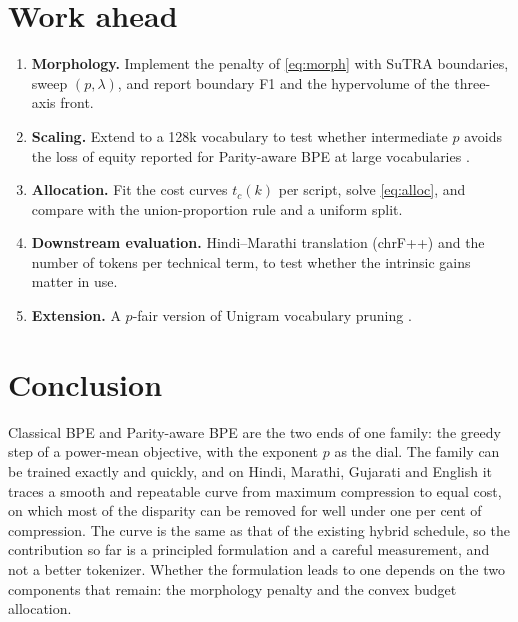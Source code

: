 \documentclass[11pt,a4paper]{article}
\theoremstyle{remark}
\begin{document}
\section{Work ahead}

\begin{enumerate}
  \item \textbf{Morphology.} Implement the penalty of \eqref{eq:morph} with SuTRA
  boundaries, sweep $(p,\lambda)$, and report boundary F1 and the hypervolume of the
  three-axis front.
  \item \textbf{Scaling.} Extend to a 128k vocabulary to test whether intermediate $p$
  avoids the loss of equity reported for Parity-aware BPE at large vocabularies
  \cite{lee2026}.
  \item \textbf{Allocation.} Fit the cost curves $t_c(k)$ per script, solve
  \eqref{eq:alloc}, and compare with the union-proportion rule \cite{brahma2026} and a
  uniform split.
  \item \textbf{Downstream evaluation.} Hindi--Marathi translation (chrF++) and the number
  of tokens per technical term, to test whether the intrinsic gains matter in use.
  \item \textbf{Extension.} A $p$-fair version of Unigram vocabulary pruning
  \cite{kudo2018}.
\end{enumerate}

\section{Conclusion}

Classical BPE and Parity-aware BPE are the two ends of one family: the greedy step of a
power-mean objective, with the exponent $p$ as the dial. The family can be trained exactly
and quickly, and on Hindi, Marathi, Gujarati and English it traces a smooth and repeatable
curve from maximum compression to equal cost, on which most of the disparity can be removed
for well under one per cent of compression. The curve is the same as that of the existing
hybrid schedule, so the contribution so far is a principled formulation and a careful
measurement, and not a better tokenizer. Whether the formulation leads to one depends on
the two components that remain: the morphology penalty and the convex budget allocation.
\end{document}
